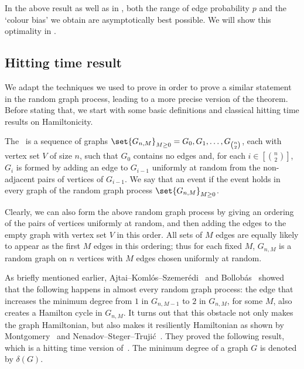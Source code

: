 \documentclass[10pt,a4paper,reqno]{amsart}
\begin{document}
In the above result as well as in , both the range of edge probability $p$ and the `colour bias' we obtain are asymptotically best possible. We will show this optimality in . 


\subsection{Hitting time result}\label{subsec:hitting time}

We adapt the techniques we used to prove  in order to prove a similar statement in the random graph process, leading to a more precise version of the theorem. Before stating that, we start with some basic definitions and classical hitting time results on Hamiltonicity.

The~ is a sequence of graphs $\set{G_{n,M}}_{M \geq 0} = G_0, G_1, \dots, G_{\binom{n}{2}}$, each with vertex set $V$ of size $n$, such that $G_0$ contains no edges and, for each $i \in [\binom{n}{2}]$, $G_i$ is formed by adding an edge to $G_{i - 1}$ uniformly at random from the non-adjacent pairs of vertices of $G_{i - 1}$. We say that an event  if \whp the event holds in every graph of the random graph process $\set{G_{n,M}}_{M \geq 0}$.


Clearly, we can also form the above random graph process by giving an ordering of the pairs of vertices uniformly at random, and then adding the edges to the empty graph with vertex set $V$ in this order. All sets of $M$ edges are equally likely to appear as the first $M$ edges in this ordering; thus for each fixed $M$, $G_{n,M}$ is a random graph on $n$ vertices with $M$ edges chosen uniformly at random.

As briefly mentioned earlier, Ajtai--Koml\'os--Szemer\'edi~\cite{Ajtai1985First} and Bollob\'as~\cite{Bollobas1984the} showed that the following happens in almost every random graph process: the edge that increases the minimum degree from $1$ in $G_{n,M-1}$ to $2$ in $G_{n,M}$, for some $M$, also creates a Hamilton cycle in $G_{n,M}$. It turns out that this obstacle not only makes the graph Hamiltonian, but also makes it resiliently Hamiltonian as shown by Montgomery~\cite{Montgomery2019resilient} and Nenadov--Steger--Truji\'c~\cite{Nenadov2019Resilience}. They proved the following result, which is a hitting time version of~. The minimum degree of a graph $G$ is denoted by $\delta(G)$.
\end{document}
